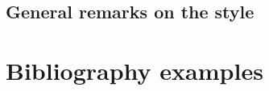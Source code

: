 \documentclass[DIV=11]{scrartcl}
\begin{document}
\subsection{General remarks on the style}


\section{Bibliography examples}
\nocite{*} 
\begin{bibexample}[breakable]
\printbibliography
\end{bibexample}
\end{document}
